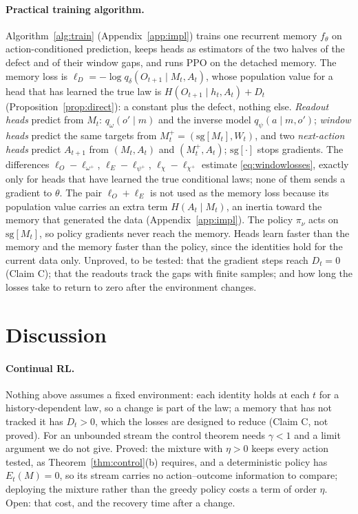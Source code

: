 \documentclass[11pt]{article}
\theoremstyle{plain}
\theoremstyle{definition}
\theoremstyle{remark}
\newcommand{\sg}{\mathrm{sg}}
\begin{document}
\paragraph{Practical training algorithm.}
Algorithm~\ref{alg:train} (Appendix~\ref{app:impl}) trains one recurrent memory $f_\theta$ on action-conditioned prediction, keeps heads as estimators of the two halves of the defect and of their window gaps, and runs PPO on the detached memory. The memory loss is $\ell_D = -\log q_\delta(O_{t+1} \mid M_t, A_t)$, whose population value for a head that has learned the true law is $H(O_{t+1} \mid h_t, A_t) + D_t$ (Proposition~\ref{prop:direct}): a constant plus the defect, nothing else. \emph{Readout heads} predict from $M_t$: $q_\omega(o' \mid m)$ and the inverse model $q_\psi(a \mid m, o')$; \emph{window heads} predict the same targets from $M^+_t = (\sg[M_t], W_t)$, and two \emph{next-action heads} predict $A_{t+1}$ from $(M_t, A_t)$ and $(M^+_t, A_t)$; $\sg[\cdot]$ stops gradients. The differences $\ell_O - \ell_{\omega^+}$, $\ell_E - \ell_{\psi^+}$, $\ell_\chi - \ell_{\chi^+}$ estimate \eqref{eq:windowlosses}, exactly only for heads that have learned the true conditional laws; none of them sends a gradient to $\theta$. The pair $\ell_O + \ell_E$ is not used as the memory loss because its population value carries an extra term $H(A_t \mid M_t)$, an inertia toward the memory that generated the data (Appendix~\ref{app:impl}). The policy $\pi_\nu$ acts on $\sg[M_t]$, so policy gradients never reach the memory. Heads learn faster than the memory and the memory faster than the policy, since the identities hold for the current data only. Unproved, to be tested: that the gradient steps reach $D_t = 0$ (Claim C); that the readouts track the gaps with finite samples; and how long the losses take to return to zero after the environment changes.

\section{Discussion}

\paragraph{Continual RL.}
Nothing above assumes a fixed environment: each identity holds at each $t$ for a history-dependent law, so a change is part of the law; a memory that has not tracked it has $D_t > 0$, which the losses are designed to reduce (Claim C, not proved). For an unbounded stream the control theorem needs $\gamma < 1$ and a limit argument we do not give. Proved: the mixture with $\eta > 0$ keeps every action tested, as Theorem~\ref{thm:control}(b) requires, and a deterministic policy has $E_t(M) = 0$, so its stream carries no action--outcome information to compare; deploying the mixture rather than the greedy policy costs a term of order $\eta$. Open: that cost, and the recovery time after a change.
\end{document}

